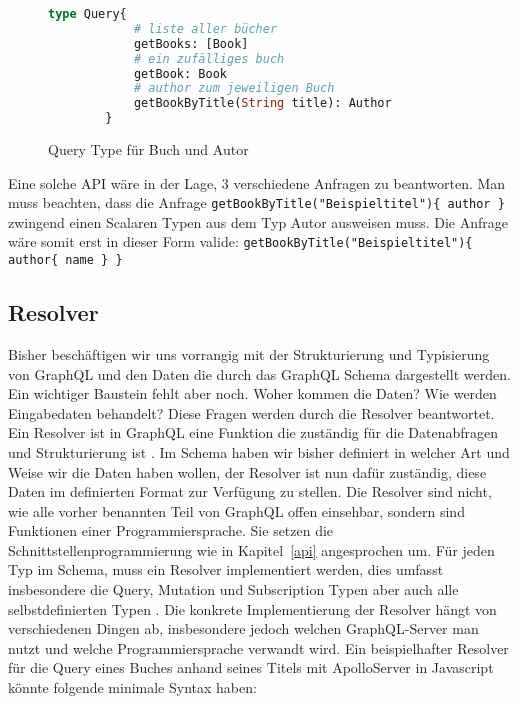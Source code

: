 \begin{figure}[htb]
    \begin{center}
        \begin{lstlisting}[language=GraphQL]
        type Query{
            # liste aller bücher
            getBooks: [Book]
            # ein zufälliges buch
            getBook: Book
            # author zum jeweiligen Buch
            getBookByTitle(String title): Author
        }
        \end{lstlisting}
    \end{center}
    \caption{Query Type für Buch und Autor}
    \label{minimalquerytype}
\end{figure}

Eine solche API wäre in der Lage, 3 verschiedene Anfragen zu beantworten.
Man muss beachten, dass die Anfrage \verb+getBookByTitle("Beispieltitel"){ author }+ zwingend einen Scalaren Typen aus dem Typ Autor ausweisen muss.
Die Anfrage wäre somit erst in dieser Form valide: \verb+getBookByTitle("Beispieltitel"){ author{ name } }+

\subsection{Resolver}

Bisher beschäftigen wir uns vorrangig mit der Strukturierung und Typisierung von GraphQL und den Daten die durch
das GraphQL Schema dargestellt werden.
Ein wichtiger Baustein fehlt aber noch.
Woher kommen die Daten?
Wie werden Eingabedaten behandelt?
Diese Fragen werden durch die Resolver beantwortet.
Ein Resolver ist in GraphQL eine Funktion die zuständig für die Datenabfragen und Strukturierung ist \cite[vgl.]{apolloqgl}.
Im Schema haben wir bisher definiert in welcher Art und Weise wir die Daten haben wollen, der Resolver ist nun dafür zuständig,
diese Daten im definierten Format zur Verfügung zu stellen.
Die Resolver sind nicht, wie alle vorher benannten Teil von GraphQL offen einsehbar, sondern sind Funktionen einer Programmiersprache.
Sie setzen die Schnittstellenprogrammierung wie in Kapitel~\ref{api} angesprochen um.
Für jeden Typ im Schema, muss ein Resolver implementiert werden, dies umfasst insbesondere die Query, Mutation und Subscription Typen aber auch
alle selbstdefinierten Typen \cite[vgl.]{apolloqgl}.
Die konkrete Implementierung der Resolver hängt von verschiedenen Dingen ab, insbesondere jedoch welchen GraphQL-Server man nutzt und welche Programmiersprache verwandt wird.
Ein beispielhafter Resolver für die Query eines Buches anhand seines Titels mit ApolloServer in Javascript könnte folgende minimale Syntax haben:

